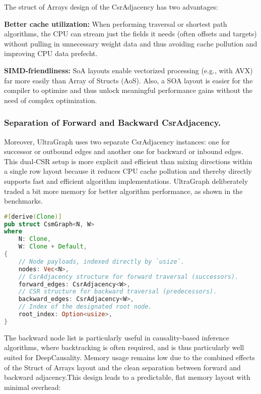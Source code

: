 The struct of Arrays design of the CsrAdjacency has two advantages:


\textbf{Better cache utilization:} When performing traversal or shortest path algorithms, the CPU can stream just the fields it needs (often offsets and targets) without pulling in unnecessary weight data and thus avoiding cache pollution and improving CPU data prefecht.

\textbf{SIMD-friendliness:} SoA layouts enable vectorized processing (e.g., with AVX) far more easily 
than Array of Structs (AoS). Also, a SOA layout is easier for the compiler to optimize and thus unlock
meaningful performance gains without the need of complex optimization. 


\subsubsection{Separation of Forward and Backward CsrAdjacency.}

Moreover, UltraGraph uses two separate CsrAdjacency instances: one for successor or outbound edges and another one for backward or inbound edges. This dual-CSR setup is more explicit and efficient than mixing directions within a single row layout because it reduces CPU cache pollution and thereby directly supports fast and efficient algorithm implementations. UltraGraph deliberately traded a bit more
memory for better algorithm performance, as shown in the benchmarks.


\begin{lstlisting}[language=Rust, label={list:SeparatedCsrAdjacency}, caption={UltraGraph: Forward and Backward CsrAdjacency}]
#[derive(Clone)]
pub struct CsmGraph<N, W>
where
    N: Clone,
    W: Clone + Default,
{
    // Node payloads, indexed directly by `usize`.
    nodes: Vec<N>,
    // CsrAdjacency structure for forward traversal (successors).
    forward_edges: CsrAdjacency<W>,
    // CSR structure for backward traversal (predecessors).
    backward_edges: CsrAdjacency<W>,
    // Index of the designated root node.
    root_index: Option<usize>,
}
\end{lstlisting}


The backward node list is particularly useful in causality-based inference algorithms, where backtracking is often required, and is thus particularly well suited for DeepCausality. Memory usage remains low due to the combined effects of the Struct of Arrays layout and the clean separation between forward and backward adjacency.This design leads to a predictable, flat memory layout with minimal overhead:

